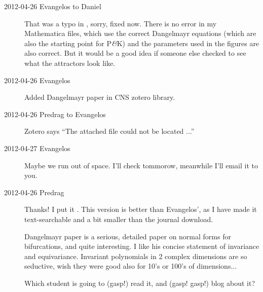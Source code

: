 \begin{description}
\item[2012-04-26 Evangelos to Daniel] That was a typo in , sorry,
fixed now. There is no error in my Mathematica files, which use the correct
Dangelmayr equations (which are also the starting point for P\textit{\&}K)
and the parameters used in the figures are also correct. But it would be a
good idea if someone else checked to see what the attractors look like.

\item[2012-04-26 Evangelos] Added Dangelmayr paper in CNS zotero library.

\item[2012-04-26 Predrag to Evangelos] Zotero says ``The attached file
could not be located ...''

\item[2012-04-27 Evangelos] Maybe we run out of space. I'll check
tommorow, meanwhile I'll email it to you.

\item[2012-04-26 Predrag] Thanks! I put it
. This version is
better than Evangelos', as I have made it text-searchable and a bit
smaller than the journal download.

Dangelmayr paper is a serious, detailed paper on normal forms
for bifurcations, and quite interesting. I like his concise statement of
invariance and equivariance. Invariant polynomials in 2 complex
dimensions are so seductive, wish they were good also for 10's or 100's
of dimensions...

Which student is going to (gasp!) read it, and (gasp! gasp!) blog about
it?


\end{description}
